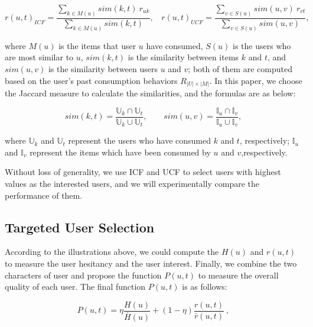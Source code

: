 \documentclass{llncs}
\begin{document}
\vspace*{-0.4cm}
\begin{small}{
$$ r(u,t)_{ICF} = \frac {\sum _{k \in M(u)}  sim(k,t)~ r_{uk}} {\sum _{k \in M(u)} sim(k,t)}, ~~~~
r(u,t)_{UCF} =  \frac {\sum _{v \in S(u)} sim(u,v)~ r_{vt}} {\sum _{v\in S(u)} sim(u,v) },$$
}\end{small} \vspace*{-0.4cm}

\noindent
where $M(u)$ is the items that user $u$  have consumed, $S(u)$ is the users who are most similar to $u$, $sim(k,t)$  is the similarity between items $k$ and $t$, and $sim(u,v)$  is the similarity between users $u$ and $v$; both of them are computed based on the user's past consumption behaviors $R_{|U| \times |M|}$.  In this paper, we choose the Jaccard measure to calculate the similarities, and the formulas are as below:

\vspace*{-0.3cm}
\begin{small}{
$$sim(k,t) =  \frac {\mathbb{U}_{k} \cap \mathbb{U}_{t}} {\mathbb{U}_{k} \cup \mathbb{U}_{t}} ,~~~~~~~~~
 sim(u,v) = \frac {\mathbb{I}_{u} \cap \mathbb{I}_{v}}{\mathbb{I}_{u} \cup \mathbb{I}_{v}} ,$$
}\end{small} \vspace*{-0.3cm}

\noindent
where $\mathbb{U}_{k}$ and $\mathbb{U}_{t}$ represent the users who have consumed $k$ and $t$, respectively; $\mathbb{I}_{u}$ and $\mathbb{I}_{v}$ represent the items which have been consumed by $u$ and $v$,respectively.

Without loss of generality, we use ICF and UCF to select users with highest values as the interested users, and we will experimentally compare the performance of them.


\vspace*{-0.4cm}
\subsection{Targeted User Selection}
\vspace*{-0.2cm}
According to the illustrations above, we could compute the $H(u)$ and $r(u,t)$ to measure the user hesitancy and the user interest. Finally, we combine the two characters of user and propose the function $P(u,t)$ to measure the overall quality of each user.  The final function $P(u,t)$ is as follows:
\vspace*{-0.3cm}
\begin{small}{
\begin{equation}\label{eq:finalP}
P(u,t) =  \eta \frac {H(u)}{\bar{H}(u)} + ( 1 - \eta ) \frac { r(u,t)} {\bar{r}(u,t)} ~,
\end{equation}
}\end{small} \vspace*{-0.4cm}
\end{document}
